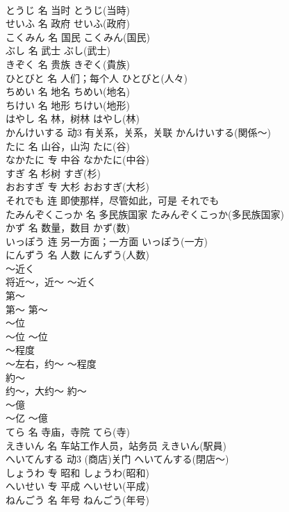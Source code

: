 \documentclass[8pt]{extreport}
\begin{document}
\begin{CJK}{UTF8}{min}
\\	とうじ	名	当时	とうじ(当時)	
\\	せいふ	名	政府	せいふ(政府)	
\\	こくみん	名	国民	こくみん(国民)	
\\	ぶし	名	武士	ぶし(武士)	
\\	きぞく	名	贵族	きぞく(貴族)	
\\	ひとびと	名	人们；每个人	ひとびと(人々)	
\\	ちめい	名	地名	ちめい(地名)	
\\	ちけい	名	地形	ちけい(地形)	
\\	はやし	名	林，树林	はやし(林)	
\\	かんけいする	动3	有关系，关系，关联	かんけいする(関係～)	
\\	たに	名	山谷，山沟	たに(谷)	
\\	なかたに	专	中谷	なかたに(中谷)	
\\	すぎ	名	杉树	すぎ(杉)	
\\	おおすぎ	专	大杉	おおすぎ(大杉)	
\\	それでも	连	即使那样，尽管如此，可是	それでも	
\\	たみんぞくこっか	名	多民族国家	たみんぞくこっか(多民族国家)	
\\	かず	名	数量，数目	かず(数)	
\\	いっぽう	连	另一方面；一方面	いっぽう(一方)	
\\	にんずう	名	人数	にんずう(人数)	
\\	～近く	
\\	将近～，近～	～近く	
\\	第～	
\\	第～	第～	
\\	～位	
\\	～位	～位	
\\	～程度	
\\	～左右，约～	～程度	
\\	約～	
\\	约～，大约～	約～	
\\	～億	
\\	～亿	～億	
\\	てら	名	寺庙，寺院	てら(寺)	
\\	えきいん	名	车站工作人员，站务员	えきいん(駅員)	
\\	へいてんする	动3	(商店)关门	へいてんする(閉店～)	
\\	しょうわ	专	昭和	しょうわ(昭和)	
\\	へいせい	专	平成	へいせい(平成)	
\\	ねんごう	名	年号	ねんごう(年号)	

\end{CJK}
\end{document}
